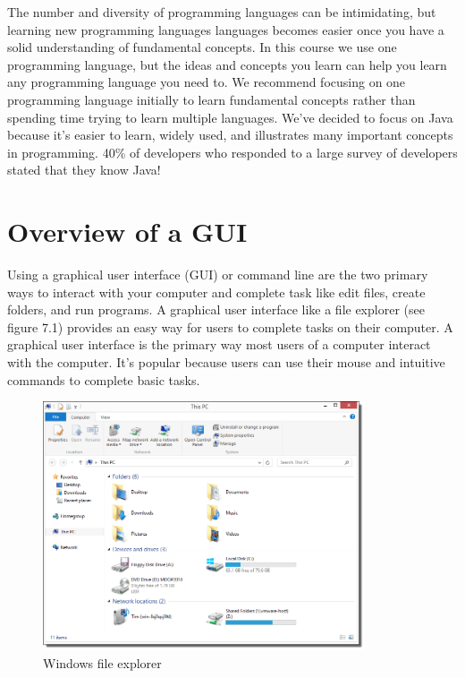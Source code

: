 The number and diversity of programming languages can be intimidating, but learning new programming languages languages becomes easier once you have a solid understanding of fundamental concepts. In this course we use one programming language, but the ideas and concepts you learn can help you learn any programming language you need to. We recommend focusing on one programming language initially to learn fundamental concepts rather than spending time trying to learn multiple languages. We’ve decided to focus on Java because it’s easier to learn, widely used, and illustrates many important concepts in programming. 40\% of developers who responded to a large survey of developers stated that they know Java! \\

\section{Overview of a GUI}

Using a graphical user interface (GUI) or command line are the two primary ways to interact with your computer and complete task like edit files, create folders, and run programs. A graphical user interface like a file explorer (see figure 7.1) provides an easy way for users to complete tasks on their computer. A graphical user interface is the primary way most users of a computer interact with the computer. It’s popular because users can use their mouse and intuitive commands to complete basic tasks. \\

\begin{figure}
	\centering
	\includegraphics[width=0.85\textwidth]{images/windowsGUI.png}
	\caption{Windows file explorer}
	\label{fig:windows:file}
\end{figure}

